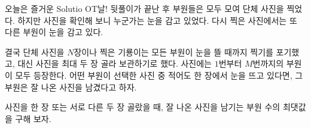 오늘은 즐거운 Solutio OT날!
뒷풀이가 끝난 후 부원들은 모두 모여 단체 사진을 찍었다. 
하지만 사진을 확인해 보니 누군가는 눈을 감고 있었다. 
다시 찍은 사진에서는 또 다른 부원이 눈을 감고 있다.

결국 단체 사진을 $N$장이나 찍은 기룡이는 모든 부원이 눈을 뜰 때까지 찍기를 포기했고, 대신 사진을 최대 두 장 골라 보관하기로 했다.
사진에는 $1$번부터 $M$번까지의 부원이 모두 등장한다. 어떤 부원이 선택한 사진 중 적어도 한 장에서 눈을 뜨고 있다면, 그 부원은 잘 나온 사진을 남겼다고 하자.

사진을 한 장 또는 서로 다른 두 장 골랐을 때, 잘 나온 사진을 남기는 부원 수의 최댓값을 구해 보자.